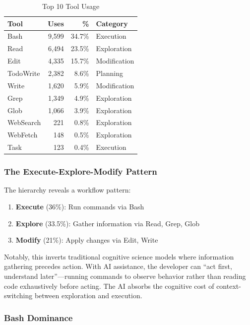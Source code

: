 \documentclass{ntlabs-preprint}
\begin{document}
\begin{table}[h]
\centering
\caption{Top 10 Tool Usage}
\label{tab:toptools}
\begin{tabular}{lrrl}
\toprule
\textbf{Tool} & \textbf{Uses} & \textbf{\%} & \textbf{Category} \\
\midrule
Bash & 9,599 & 34.7\% & Execution \\
Read & 6,494 & 23.5\% & Exploration \\
Edit & 4,335 & 15.7\% & Modification \\
TodoWrite & 2,382 & 8.6\% & Planning \\
Write & 1,620 & 5.9\% & Modification \\
Grep & 1,349 & 4.9\% & Exploration \\
Glob & 1,066 & 3.9\% & Exploration \\
WebSearch & 221 & 0.8\% & Exploration \\
WebFetch & 148 & 0.5\% & Exploration \\
Task & 123 & 0.4\% & Execution \\
\bottomrule
\end{tabular}
\end{table}

\subsubsection{The Execute-Explore-Modify Pattern}

The hierarchy reveals a workflow pattern:
\begin{enumerate}
    \item \textbf{Execute} (36\%): Run commands via Bash
    \item \textbf{Explore} (33.5\%): Gather information via Read, Grep, Glob
    \item \textbf{Modify} (21\%): Apply changes via Edit, Write
\end{enumerate}

Notably, this inverts traditional cognitive science models where information gathering precedes action. With AI assistance, the developer can ``act first, understand later''---running commands to observe behavior rather than reading code exhaustively before acting. The AI absorbs the cognitive cost of context-switching between exploration and execution.

\subsubsection{Bash Dominance}
\end{document}
